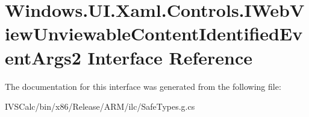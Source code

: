\hypertarget{interface_windows_1_1_u_i_1_1_xaml_1_1_controls_1_1_i_web_view_unviewable_content_identified_event_args2}{}\section{Windows.\+U\+I.\+Xaml.\+Controls.\+I\+Web\+View\+Unviewable\+Content\+Identified\+Event\+Args2 Interface Reference}
\label{interface_windows_1_1_u_i_1_1_xaml_1_1_controls_1_1_i_web_view_unviewable_content_identified_event_args2}


The documentation for this interface was generated from the following file\+:\begin{DoxyCompactItemize}
\item 
I\+V\+S\+Calc/bin/x86/\+Release/\+A\+R\+M/ilc/Safe\+Types.\+g.\+cs\end{DoxyCompactItemize}
